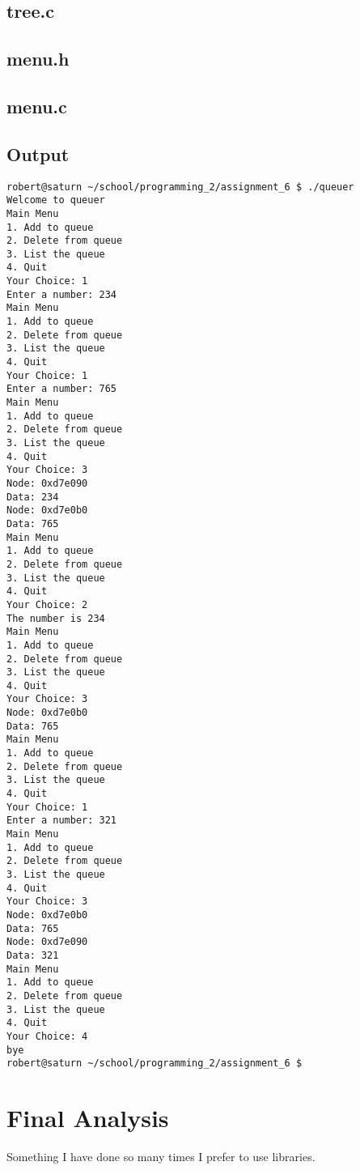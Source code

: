 \documentclass[letterpaper,oneside]{scrartcl}
\begin{document}
\subsection{tree.c}

\subsection{menu.h}

\subsection{menu.c}

\subsection{Output}
\begin{Verbatim}
robert@saturn ~/school/programming_2/assignment_6 $ ./queuer 
Welcome to queuer
Main Menu
1. Add to queue
2. Delete from queue
3. List the queue
4. Quit
Your Choice: 1
Enter a number: 234
Main Menu
1. Add to queue
2. Delete from queue
3. List the queue
4. Quit
Your Choice: 1
Enter a number: 765
Main Menu
1. Add to queue
2. Delete from queue
3. List the queue
4. Quit
Your Choice: 3
Node: 0xd7e090
Data: 234
Node: 0xd7e0b0
Data: 765
Main Menu
1. Add to queue
2. Delete from queue
3. List the queue
4. Quit
Your Choice: 2
The number is 234
Main Menu
1. Add to queue
2. Delete from queue
3. List the queue
4. Quit
Your Choice: 3
Node: 0xd7e0b0
Data: 765
Main Menu
1. Add to queue
2. Delete from queue
3. List the queue
4. Quit
Your Choice: 1
Enter a number: 321
Main Menu
1. Add to queue
2. Delete from queue
3. List the queue
4. Quit
Your Choice: 3
Node: 0xd7e0b0
Data: 765
Node: 0xd7e090
Data: 321
Main Menu
1. Add to queue
2. Delete from queue
3. List the queue
4. Quit
Your Choice: 4
bye
robert@saturn ~/school/programming_2/assignment_6 $ 
\end{Verbatim}

\section{Final Analysis}

Something I have done so many times I prefer to use libraries.
\end{document}
